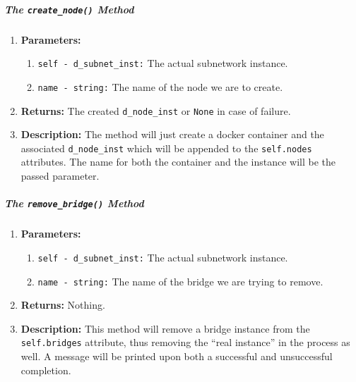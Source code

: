                     \subparagraph{The \texttt{create\_node()} Method}
                        \begin{enumerate}
                            \item \textbf{Parameters:}
                            \begin{enumerate}
                                \item \texttt{self - d\_subnet\_inst:} The actual subnetwork instance.
                                \item \texttt{name - string:} The name of the node we are to create.
                            \end{enumerate}
                            \item \textbf{Returns:} The created \texttt{d\_node\_inst} or \texttt{None} in case of failure.
                            \item \textbf{Description:} The method will just create a docker container and the associated \texttt{d\_node\_inst} which will be appended to the \texttt{self.nodes} attributes. The name for both the container and the instance will be the passed parameter.
                        \end{enumerate}

                    \subparagraph{The \texttt{remove\_bridge()} Method}
                        \begin{enumerate}
                            \item \textbf{Parameters:}
                            \begin{enumerate}
                                \item \texttt{self - d\_subnet\_inst:} The actual subnetwork instance.
                                \item \texttt{name - string:} The name of the bridge we are trying to remove.
                            \end{enumerate}
                            \item \textbf{Returns:} Nothing.
                            \item \textbf{Description:} This method will remove a bridge instance from the \texttt{self.bridges} attribute, thus removing the ``real instance'' in the process as well. A message will be printed upon both a successful and unsuccessful completion.
                        \end{enumerate}

